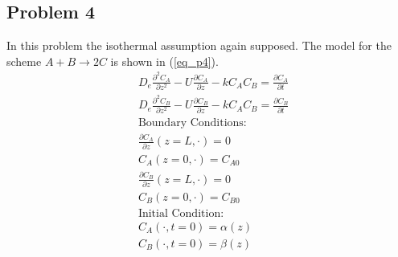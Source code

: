 \documentclass[11pt,fleqn]{article}
\theoremstyle{defstyle}
\begin{document}
\subsection{Problem 4}
In this problem the isothermal assumption again supposed. The model for the scheme $A + 
B \rightarrow 2C$ is shown in (\ref{eq_p4}). 
\begin{equation}
\begin{aligned}
&D_e \frac{\partial^2 C_A}{\partial z^2} - U \frac{\partial C_A}{\partial z} - kC_AC_B 
= \frac{\partial C_A}{\partial t} \\
&D_e \frac{\partial^2 C_B}{\partial z^2} - U \frac{\partial C_B}{\partial z} - kC_AC_B 
= \frac{\partial C_B}{\partial t} \\
&\text{Boundary Conditions:} \\
&\frac{\partial C_A}{\partial z}(z=L, \cdot) = 0\\
&C_A(z=0, \cdot) = C_{A0} \\
&\frac{\partial C_B}{\partial z}(z=L, \cdot) = 0\\
&C_B(z=0, \cdot) = C_{B0} \\
&\text{Initial Condition:} \\
& C_A(\cdot, t= 0) = \alpha(z) \\
& C_B(\cdot, t= 0) = \beta(z)
\end{aligned}
\label{eq_p4}
\end{equation}



\newpage


\end{document}
